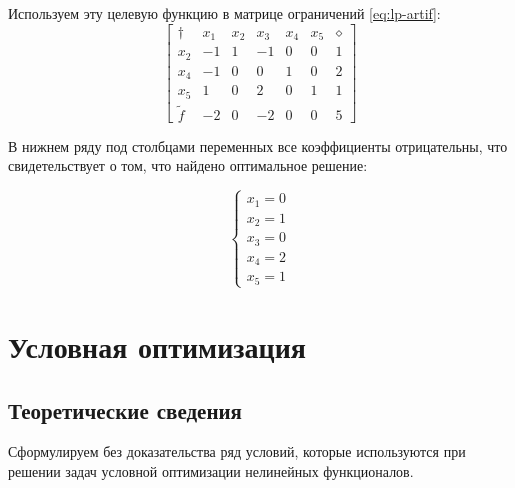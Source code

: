 \documentclass{article}
\numberwithin{equation}{section}
\begin{document}
Используем эту целевую функцию в матрице ограничений \eqref{eq:lp-artif}:
\begin{equation*}
  \begin{bmatrix}
    \dagger & x_1 & x_2 & x_3 & x_4 & x_5 & \diamond\\
    x_2 & -1 & 1 & -1 & 0 & 0 & 1\\
    x_4 & -1 & 0 &  0 & 1 & 0 & 2\\
    x_5 &  1 & 0 &  2 & 0 & 1 & 1\\
    \tilde{f} & -2 & 0 & -2 & 0 & 0 & 5
  \end{bmatrix}
\end{equation*}

В нижнем ряду под столбцами переменных все коэффициенты отрицательны,
что свидетельствует о том, что найдено оптимальное решение:

\begin{equation}
  \begin{cases}
    x_1 = 0\\
    x_2 = 1\\
    x_3 = 0\\
    x_4 = 2\\
    x_5 = 1
  \end{cases}
\end{equation}

\clearpage
\section{Условная оптимизация}

\subsection{Теоретические сведения}

Сформулируем без доказательства ряд условий, которые используются при
решении задач условной оптимизации нелинейных функционалов. 
\end{document}
